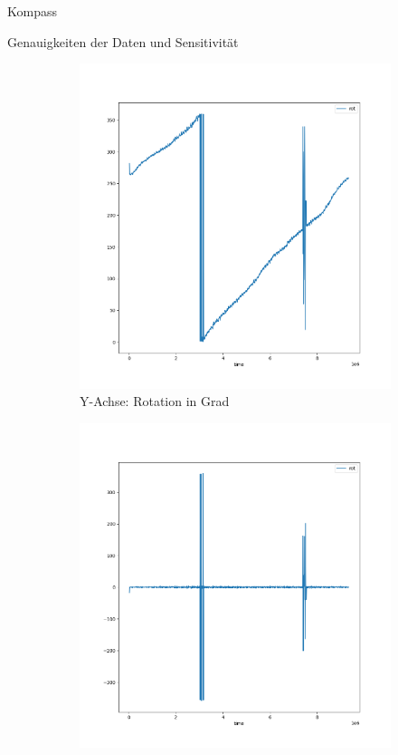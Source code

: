\documentclass[12pt]{report}
\begin{document}
\begin{section}{Kompass}
\begin{subsection}{Genauigkeiten der Daten und Sensitivität}
  \begin{figure}[h!]
    \centering
    \captionsetup[subfigure]{labelformat=empty}
    \begin{subfigure}{0.45\linewidth}
      \includegraphics[width=\linewidth]{lernportfolio_assets/CompassRotation360.png}
      \caption{Y-Achse: Rotation in Grad}
    \end{subfigure}
    \begin{subfigure}{0.45\linewidth}
      \includegraphics[width=\linewidth]{lernportfolio_assets/CompassRotation360Diff.png}

\end{subfigure}
\end{figure}
\end{subsection}
\end{section}
\end{document}
